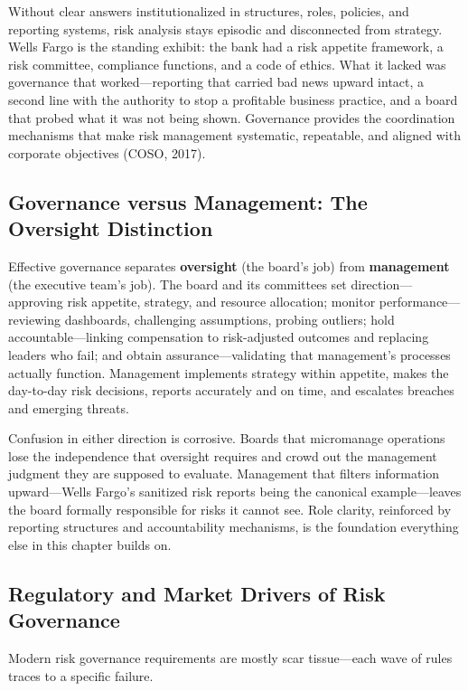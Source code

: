 \documentclass[11pt,openany]{book}
\begin{document}
Without clear answers institutionalized in structures, roles, policies, and
reporting systems, risk analysis stays episodic and disconnected from
strategy. Wells Fargo is the standing exhibit: the bank had a risk appetite
framework, a risk committee, compliance functions, and a code of ethics. What
it lacked was governance that worked---reporting that carried bad news upward
intact, a second line with the authority to stop a profitable business
practice, and a board that probed what it was not being shown. Governance
provides the coordination mechanisms that make risk management systematic,
repeatable, and aligned with corporate objectives (COSO, 2017).

\subsection{Governance versus Management: The Oversight Distinction}

Effective governance separates \textbf{oversight} (the board's job) from
\textbf{management} (the executive team's job). The board and its committees
set direction---approving risk appetite, strategy, and resource allocation;
monitor performance---reviewing dashboards, challenging assumptions, probing
outliers; hold accountable---linking compensation to risk-adjusted outcomes
and replacing leaders who fail; and obtain assurance---validating that
management's processes actually function. Management implements strategy
within appetite, makes the day-to-day risk decisions, reports accurately and
on time, and escalates breaches and emerging threats.

Confusion in either direction is corrosive. Boards that micromanage
operations lose the independence that oversight requires and crowd out the
management judgment they are supposed to evaluate. Management that filters
information upward---Wells Fargo's sanitized risk reports being the canonical
example---leaves the board formally responsible for risks it cannot see. Role
clarity, reinforced by reporting structures and accountability mechanisms, is
the foundation everything else in this chapter builds on.

\subsection{Regulatory and Market Drivers of Risk Governance}

Modern risk governance requirements are mostly scar tissue---each wave of
rules traces to a specific failure.
\end{document}
